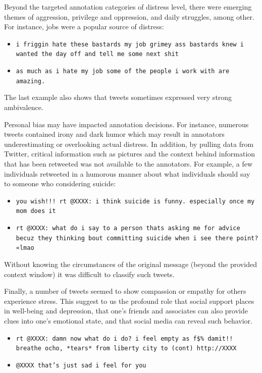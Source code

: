 \documentclass[11pt]{article}
\begin{document}
Beyond the targeted annotation categories of distress level, there were emerging themes of aggression, privilege and oppression, and daily struggles, among other.  For instance, jobs were a popular source of distress:

\begin{itemize}
\footnotesize
\item \texttt{i friggin hate these bastards \@ my job grimey ass bastards knew i wanted the day off and tell me some next shit}
\item \texttt{as much as i hate my job some of the people i work with are amazing.}
\end{itemize}

The last example also shows that tweets sometimes expressed very strong ambivalence.

Personal bias may have impacted annotation decisions. For instance, numerous tweets contained irony and dark humor which may result in annotators underestimating or overlooking actual distress. In addition, by pulling data from Twitter, critical information such as pictures and the context behind information that has been retweeted was not available to the annotators.  For example, a few individuals retweeted in a humorous manner about what individuals should say to someone who considering suicide:

\begin{itemize}
\footnotesize
\item \texttt{you wish!!! rt @XXXX: i think suicide is funny. especially once my mom does it}
\item \texttt{rt @XXXX: what do i say to a person thats asking me for advice becuz they thinking bout committing suicide when i see there point? «lmao}
\end{itemize}
Without knowing the circumstances of the original message (beyond the provided context window) it was difficult to classify such tweets.  %

Finally, a number of tweets seemed to show compassion or empathy for others experience stress. This suggest to us the profound role that social support places in well-being and depression, that one's friends and associates can also provide clues into one's emotional state, and that social media can reveal such behavior.

\begin{itemize}
\footnotesize
\item \texttt{rt @XXXX: damn now what do i do? i feel empty as f\$\% damit!! breathe ocho, *tears* from liberty city to (cont) http://XXXX}
\item \texttt{@XXXX that's just sad i feel for you }
\end{itemize}
\end{document}
